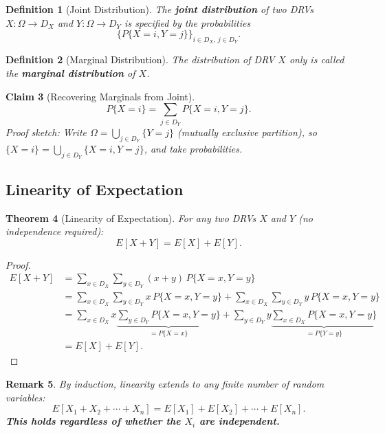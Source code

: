 \documentclass[12pt]{article}
\theoremstyle{definition_style}
\newtheorem{defn}{Definition}[section]
\newtheorem{thm}[defn]{Theorem}
\newtheorem{claim}[defn]{Claim}
\newtheorem{remark}[defn]{Remark}
\begin{document}
\begin{defn}[Joint Distribution]
The \textbf{joint distribution} of two DRVs $X: \Omega \to D_X$ and $Y: \Omega \to D_Y$ is specified by the probabilities
\[
    \{P\{X = i, Y = j\}\}_{i \in D_X,\, j \in D_Y}.
\]
\end{defn}

\begin{defn}[Marginal Distribution]
The distribution of DRV $X$ only is called the \textbf{marginal distribution} of $X$.
\end{defn}

\begin{claim}[Recovering Marginals from Joint]
\[
    P\{X = i\} = \sum_{j \in D_Y} P\{X = i, Y = j\}.
\]
\textit{Proof sketch:} Write $\Omega = \bigcup_{j \in D_Y}\{Y = j\}$ (mutually exclusive partition), so $\{X=i\} = \bigcup_{j \in D_Y}\{X=i, Y=j\}$, and take probabilities.
\end{claim}

\subsection{Linearity of Expectation}

\begin{thm}[Linearity of Expectation]
For any two DRVs $X$ and $Y$ (no independence required):
\[
    E[X + Y] = E[X] + E[Y].
\]
\end{thm}

\begin{proof}
\begin{align*}
E[X + Y] &= \sum_{x \in D_X} \sum_{y \in D_Y} (x + y) \, P\{X = x, Y = y\} \\
          &= \sum_{x \in D_X} \sum_{y \in D_Y} x \, P\{X=x, Y=y\} + \sum_{x \in D_X} \sum_{y \in D_Y} y \, P\{X=x, Y=y\} \\
          &= \sum_{x \in D_X} x \underbrace{\sum_{y \in D_Y} P\{X=x, Y=y\}}_{= P\{X=x\}} + \sum_{y \in D_Y} y \underbrace{\sum_{x \in D_X} P\{X=x, Y=y\}}_{= P\{Y=y\}} \\
          &= E[X] + E[Y].
\end{align*}
\end{proof}

\begin{remark}
By induction, linearity extends to any finite number of random variables:
\[
    E[X_1 + X_2 + \cdots + X_n] = E[X_1] + E[X_2] + \cdots + E[X_n].
\]
\textbf{This holds regardless of whether the $X_i$ are independent.}
\end{remark}
\end{document}
